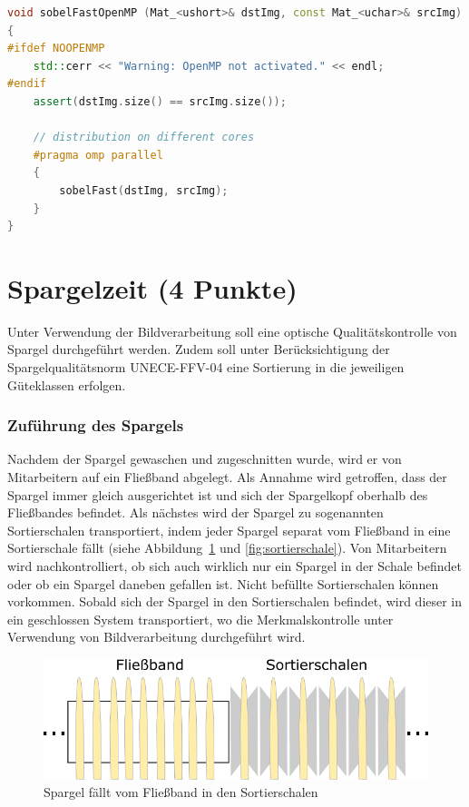 \documentclass{ezb}
\begin{document}
\begin{lstlisting}[language=C++, caption=openMP wrapper that calls \textbackslash c sobelFast in a parallel section]
void sobelFastOpenMP (Mat_<ushort>& dstImg, const Mat_<uchar>& srcImg)
{
#ifdef NOOPENMP
	std::cerr << "Warning: OpenMP not activated." << endl;
#endif
	assert(dstImg.size() == srcImg.size());

	// distribution on different cores
	#pragma omp parallel
	{	
		sobelFast(dstImg, srcImg);
	}
}
\end{lstlisting}

\newpage
\section{Spargelzeit (4 Punkte)}
Unter Verwendung der Bildverarbeitung soll eine optische Qualitätskontrolle von Spargel durchgeführt werden. Zudem soll unter Berücksichtigung der Spargelqualitätsnorm UNECE-FFV-04 eine Sortierung in die jeweiligen Güteklassen erfolgen.

\subsubsection*{Zuführung des Spargels}
Nachdem der Spargel gewaschen und zugeschnitten wurde, wird er von Mitarbeitern auf ein Fließband abgelegt. Als Annahme wird getroffen, dass der Spargel immer gleich ausgerichtet ist und sich der Spargelkopf oberhalb des Fließbandes befindet. Als nächstes wird der Spargel zu sogenannten Sortierschalen transportiert, indem jeder Spargel separat vom Fließband in eine Sortierschale fällt (siehe Abbildung~\ref{fig:fliessband} und \ref{fig:sortierschale}). Von Mitarbeitern wird nachkontrolliert, ob sich auch wirklich nur ein Spargel in der Schale befindet oder ob ein Spargel daneben gefallen ist. Nicht befüllte Sortierschalen können vorkommen. Sobald sich der Spargel in den Sortierschalen befindet, wird dieser in ein geschlossen System transportiert, wo die Merkmalskontrolle unter Verwendung von Bildverarbeitung durchgeführt wird.
\begin{figure}[!h]
	\begin{center}
		\includegraphics[scale=1.0]{fliessband_zu_sortierschalen.png}
	\end{center}
	\caption{Spargel fällt vom Fließband in den Sortierschalen}
	\label{fig:fliessband}
\end{figure}
\end{document}
